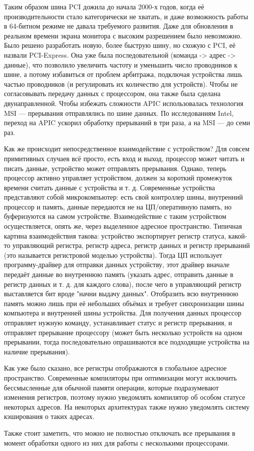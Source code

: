 \documentclass[main.tex]{subfiles}
\begin{document}
Таким образом шина PCI дожила до начала 2000-х годов, когда её производительности
стало категорически не хватать, и даже возможность работы в 64-битном режиме
не давала требуемого развития. Даже для обновления в реальном времени экрана
монитора с высоким разрешением было невозможно. Было решено  разработать новую,
более быструю шину, но схожую с PCI, её назвали PCI-Express.
Она уже была последовательной (команда -> адрес -> данные), что позволило
увеличить частоту и уменьшить число проводников к шине, а потому избавиться
от проблем арбитража, подключая устройства лишь частью проводников (и
регулировать их количество для устройств).
Чтобы не согласовывать передачу данных с процессором, она также была сделана
двунаправленной. Чтобы избежать сложности APIC использовалась технология
MSI --- прерывания отправлялись по шине данных. По исследованиям Intel,
переход на APIC ускорил обработку прерываний в три раза, а на MSI ---
до семи раз.

Как же происходит непосредственное взаимодействие с устройством?
Для совсем примитивных случаев всё просто, есть вход и выход, процессор может
читать и писать данные, устройство может отправлять прерывания.
Однако, теперь процессор активно управляет устройством, должен за короткий
промежуток времени считать данные с устройства и т. д.
Современные устройства представляют собой микрокомпьютер: есть свой
контроллер шины, внутренний процессор и память, данные передаются
не на ЦП/оперативную память, но буферизуются на самом устройстве.
Взаимодействие с таким устройством осуществляется, опять же, через
выделенное адресное пространство. Типичная картина взаимодействия такова:
устройство экспортирует регистр статуса, какой-то управляющий регистра,
регистр адреса, регистр данных и регистр прерываний (это называется регистровой моделью устройства).
Тогда ЦП использует программу-драйвер для отправки данных устройству,
этот драйвер вначале передаёт данные во внутреннюю память
(указать адрес, отправить данные в регистр данных и т. д. для каждого слова),
после чего в управляющий регистр выставляется бит вроде "начни выдачу данных".
Отобразить всю внутреннюю память можно лишь при её небольших объёмах
и требует синхронизации шины компьютера и внутренней шины устройства.
Для получения данных процессор отправляет нужную команду, устанавливает
статус и регистр прерывания, и отправляет прерывание процессору
(может быть несколько устройств на одном прерывании, тогда последовательно
опрашиваются все подходящие устройства на наличие прерывания).

Как уже было сказано, все регистры отображаются в глобальное адресное пространство.
Современные компиляторы при оптимизации могут исключить бессмысленные для
обычной памяти операции, которые подразумевают изменения регистров, поэтому
нужно уведомлять компилятор об особом статусе некоторых адресов.
На некоторых архитектурах также нужно уведомлять систему кэширования о таких
адресах.

Также стоит заметить, что можно не полностью отключать все прерывания в момент
обработки одного из них для работы с несколькими процессорами.
\end{document}
